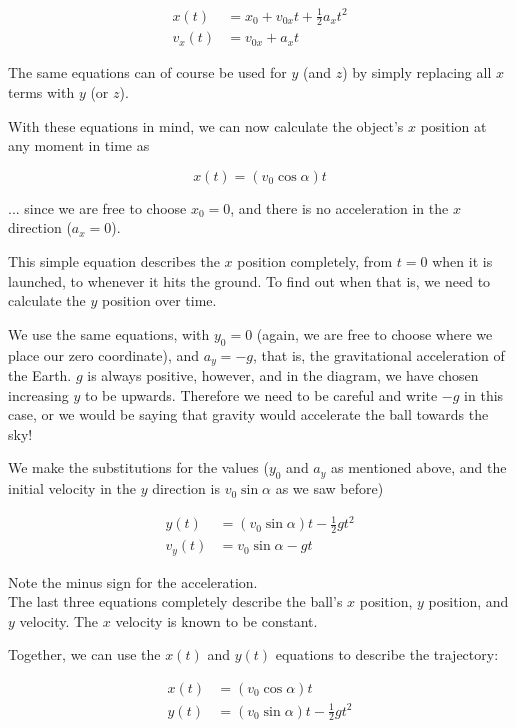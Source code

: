 \documentclass[12pt,a4paper]{report}
\begin{document}
\begin{align}
x(t) &= x_0 + v_{0x} t + \frac{1}{2} a_x t^2\\
v_x(t) &= v_{0x} + a_x t
\end{align}

The same equations can of course be used for $y$ (and $z$) by simply replacing all $x$ terms with $y$ (or $z$).

With these equations in mind, we can now calculate the object's $x$ position at any moment in time as

\begin{equation}
x(t) = (v_0 \cos \alpha) t
\end{equation}

... since we are free to choose $x_0 = 0$, and there is no acceleration in the $x$ direction ($a_x = 0$).

This simple equation describes the $x$ position completely, from $t=0$ when it is launched, to whenever it hits the ground. To find out when that is, we need to calculate the $y$ position over time.

We use the same equations, with $y_0 = 0$	 (again, we are free to choose where we place our zero coordinate), and $a_y = -g$, that is, the gravitational acceleration of the Earth. $g$ is always positive, however, and in the diagram, we have chosen increasing $y$ to be upwards. Therefore we need to be careful and write $-g$ in this case, or we would be saying that gravity would accelerate the ball towards the sky!

We make the substitutions for the values ($y_0$ and $a_y$ as mentioned above, and the initial velocity in the $y$ direction is $v_0 \sin \alpha$ as we saw before)

\begin{align}
y(t) &= (v_0 \sin \alpha) t - \frac{1}{2} g t^2\\
v_y(t) &= v_0 \sin \alpha - g t
\end{align}

Note the minus sign for the acceleration.\\
The last three equations completely describe the ball's $x$ position, $y$ position, and $y$ velocity. The $x$ velocity is known to be constant.

Together, we can use the $x(t)$ and $y(t)$ equations to describe the trajectory:

\begin{align*}
x(t) &= (v_0 \cos \alpha) t\\
y(t) &= (v_0 \sin \alpha) t - \frac{1}{2} g t^2
\end{align*}
\end{document}
